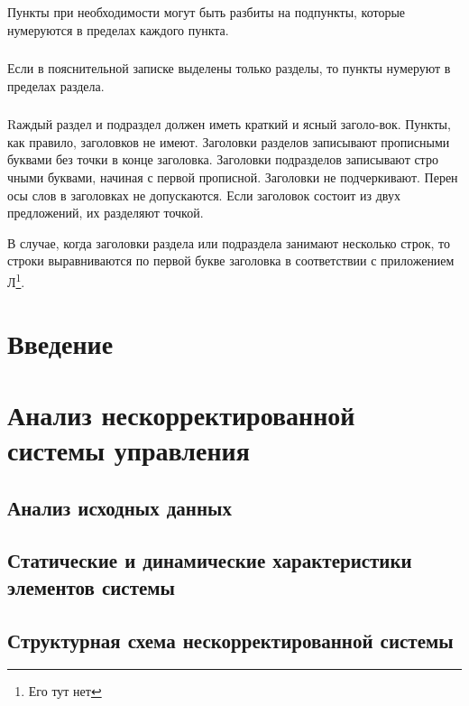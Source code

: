 Пункты при необходимости могут быть разбиты на подпункты, которые нумеруются в пределах каждого пункта. 

\subsubsection{}
Если в пояснительной записке выделены только разделы, то пункты нумеруют в пределах раздела.

\subsubsection{}
Rаждый раздел и подраздел должен иметь краткий и ясный заголо-вок. Пункты, как правило, заголовков не имеют. Заголовки разделов записывают прописными буквами без точки в конце заголовка. Заголовки подразделов записывают стро чными буквами, начиная с первой прописной. Заголовки не подчеркивают. Перен осы слов в заголовках не допускаются. Если заголовок состоит из двух предложений, их разделяют точкой.

В случае, когда заголовки раздела или подраздела занимают несколько строк, то строки выравниваются  по первой букве  заголовка  в соответствии с приложением Л\footnote{Его тут нет}.


\section*{Введение}
\label{sec:intro}
 \newpage

\section{Анализ нескорректированной системы управления} \newpage
\label{sec:analysys_equations}

\subsection{Анализ исходных данных} \newpage 
\label{sec:analysys_data}

\subsection{Статические и динамические характеристики элементов системы} \newpage 
\label{sec:stat_and_dyn}

\subsection{Структурная схема нескорректированной системы} \newpage 
\label{sec:str_schema}

